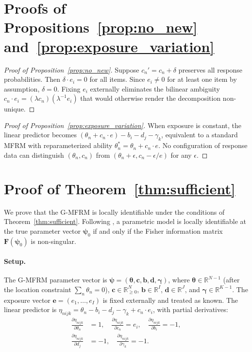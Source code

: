 \section{Proofs of Propositions~\ref{prop:no_new} and~\ref{prop:exposure_variation}}
\label{app:prop_proofs}

\begin{proof}[Proof of Proposition~\ref{prop:no_new}]
Suppose $c_n' = c_n + \delta$ preserves all response probabilities. Then $\delta \cdot e_i = 0$ for all items. Since $e_i \neq 0$ for at least one item by assumption, $\delta = 0$. Fixing $e_i$ externally eliminates the bilinear ambiguity $c_n \cdot e_i = (\lambda c_n)(\lambda^{-1} e_i)$ that would otherwise render the decomposition non-unique.
\end{proof}

\begin{proof}[Proof of Proposition~\ref{prop:exposure_variation}]
When exposure is constant, the linear predictor becomes $(\theta_n + c_n \cdot e) - b_i - d_j - \gamma_k$, equivalent to a standard MFRM with reparameterized ability $\theta^*_n = \theta_n + c_n \cdot e$. No configuration of response data can distinguish $(\theta_n, c_n)$ from $(\theta_n + \epsilon, c_n - \epsilon/e)$ for any $\epsilon$.
\end{proof}


\section{Proof of Theorem~\ref{thm:sufficient}}
\label{app:proof}

We prove that the G-MFRM is locally identifiable under the conditions of Theorem~\ref{thm:sufficient}. Following \citet{rothenberg1971}, a parametric model is locally identifiable at the true parameter vector $\boldsymbol{\psi}_0$ if and only if the Fisher information matrix $\mathbf{F}(\boldsymbol{\psi}_0)$ is non-singular.

\paragraph{Setup.} The G-MFRM parameter vector is $\boldsymbol{\psi} = (\boldsymbol{\theta}, \mathbf{c}, \mathbf{b}, \mathbf{d}, \boldsymbol{\gamma})$, where $\boldsymbol{\theta} \in \mathbb{R}^{N-1}$ (after the location constraint $\sum_n \theta_n = 0$), $\mathbf{c} \in \mathbb{R}_{\geq 0}^N$, $\mathbf{b} \in \mathbb{R}^I$, $\mathbf{d} \in \mathbb{R}^J$, and $\boldsymbol{\gamma} \in \mathbb{R}^{K-1}$. The exposure vector $\mathbf{e} = (e_1, \ldots, e_I)$ is fixed externally and treated as known. The linear predictor is $\eta_{nijk} = \theta_n - b_i - d_j - \gamma_k + c_n \cdot e_i$, with partial derivatives:
%
\begin{align*}
\frac{\partial \eta_{nijk}}{\partial \theta_n} &= 1, \quad
\frac{\partial \eta_{nijk}}{\partial c_n} = e_i, \quad
\frac{\partial \eta_{nijk}}{\partial b_i} = -1, \\
\frac{\partial \eta_{nijk}}{\partial d_j} &= -1, \quad
\frac{\partial \eta_{nijk}}{\partial \gamma_k} = -1.
\end{align*}

